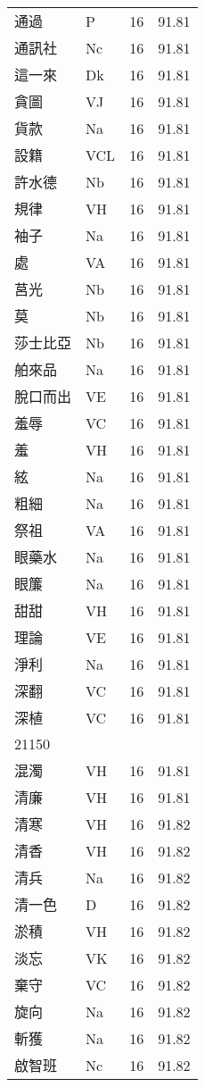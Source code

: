 \documentclass[twocolumn]{book}
\begin{document}
\begin{supertabular}{llrr}
通過 & P & 16 &  91.81\\
通訊社 & Nc & 16 &  91.81\\
這一來 & Dk & 16 &  91.81\\
貪圖 & VJ & 16 &  91.81\\
貨款 & Na & 16 &  91.81\\
設籍 & VCL & 16 &  91.81\\
許水德 & Nb & 16 &  91.81\\
規律 & VH & 16 &  91.81\\
袖子 & Na & 16 &  91.81\\
處 & VA & 16 &  91.81\\
莒光 & Nb & 16 &  91.81\\
莫 & Nb & 16 &  91.81\\
莎士比亞 & Nb & 16 &  91.81\\
舶來品 & Na & 16 &  91.81\\
脫口而出 & VE & 16 &  91.81\\
羞辱 & VC & 16 &  91.81\\
羞 & VH & 16 &  91.81\\
絃 & Na & 16 &  91.81\\
粗細 & Na & 16 &  91.81\\
祭祖 & VA & 16 &  91.81\\
眼藥水 & Na & 16 &  91.81\\
眼簾 & Na & 16 &  91.81\\
甜甜 & VH & 16 &  91.81\\
理論 & VE & 16 &  91.81\\
淨利 & Na & 16 &  91.81\\
深翻 & VC & 16 &  91.81\\
深植 & VC & 16 &  91.81\\
21150\\
混濁 & VH & 16 &  91.81\\
清廉 & VH & 16 &  91.81\\
清寒 & VH & 16 &  91.82\\
清香 & VH & 16 &  91.82\\
清兵 & Na & 16 &  91.82\\
清一色 & D & 16 &  91.82\\
淤積 & VH & 16 &  91.82\\
淡忘 & VK & 16 &  91.82\\
棄守 & VC & 16 &  91.82\\
旋向 & Na & 16 &  91.82\\
斬獲 & Na & 16 &  91.82\\
啟智班 & Nc & 16 &  91.82\\

\end{supertabular}
\end{document}
